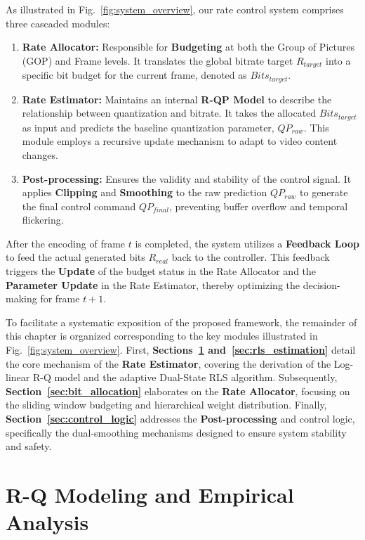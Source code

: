As illustrated in Fig.~\ref{fig:system_overview}, our rate control system comprises three cascaded modules:
\begin{enumerate}
    \item \textbf{Rate Allocator:} Responsible for \textbf{Budgeting} at both the Group of Pictures (GOP) and Frame levels. It translates the global bitrate target $R_{target}$ into a specific bit budget for the current frame, denoted as $Bits_{target}$.
    
    \item \textbf{Rate Estimator:} Maintains an internal \textbf{R-QP Model} to describe the relationship between quantization and bitrate. It takes the allocated $Bits_{target}$ as input and predicts the baseline quantization parameter, $QP_{raw}$. This module employs a recursive update mechanism to adapt to video content changes.
    
    \item \textbf{Post-processing:} Ensures the validity and stability of the control signal. It applies \textbf{Clipping} and \textbf{Smoothing} to the raw prediction $QP_{raw}$ to generate the final control command $QP_{final}$, preventing buffer overflow and temporal flickering.
\end{enumerate}

After the encoding of frame $t$ is completed, the system utilizes a \textbf{Feedback Loop} to feed the actual generated bits $R_{real}$ back to the controller. This feedback triggers the \textbf{Update} of the budget status in the Rate Allocator and the \textbf{Parameter Update} in the Rate Estimator, thereby optimizing the decision-making for frame $t+1$.

To facilitate a systematic exposition of the proposed framework, the remainder of this chapter is organized corresponding to the key modules illustrated in Fig.~\ref{fig:system_overview}. 
First, \textbf{Sections~\ref{sec:rq_modeling} and~\ref{sec:rls_estimation}} detail the core mechanism of the \textbf{Rate Estimator}, covering the derivation of the Log-linear R-Q model and the adaptive Dual-State RLS algorithm. 
Subsequently, \textbf{Section~\ref{sec:bit_allocation}} elaborates on the \textbf{Rate Allocator}, focusing on the sliding window budgeting and hierarchical weight distribution. 
Finally, \textbf{Section~\ref{sec:control_logic}} addresses the \textbf{Post-processing} and control logic, specifically the dual-smoothing mechanisms designed to ensure system stability and safety.


\section{R-Q Modeling and Empirical Analysis}
\label{sec:rq_modeling}

